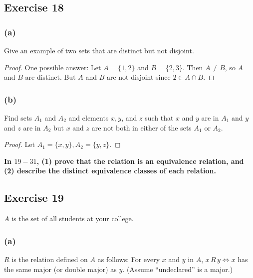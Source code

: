 \documentclass[14pt]{extarticle}
\newcommand{\cy}{\color{cyan}}
\begin{document}
\subsection{Exercise 18}

\subsubsection{(a)}
Give an example of two sets that are distinct but not disjoint.

\begin{proof}
One possible answer: Let \(A = \{1, 2\}\) and \(B = \{2, 3\}\). Then \(A \neq B\), so \(A\) and \(B\) are distinct. 
But \(A\) and \(B\) are not disjoint since \(2 \in A \cap B\).
\end{proof}

\subsubsection{(b)}
Find sets \(A_1\) and \(A_2\) and elements \(x, y\), and \(z\) such that \(x\) and \(y\) are in \(A_1\) and \(y\) and 
\(z\) are in \(A_2\) but \(x\) and \(z\) are not both in either of the sets \(A_1\) or \(A_2\).

\begin{proof}
Let \(A_1 = \{x, y\}, A_2 = \{y, z\}\).
\end{proof}

{\bf \cy In $19-31$, (1) prove that the relation is an equivalence relation, and (2) describe the distinct 
equivalence classes of each relation.}

\subsection{Exercise 19}
\(A\) is the set of all students at your college.

\subsubsection{(a)}
\(R\) is the relation defined on \(A\) as follows: For every \(x\) and \(y\) in \(A\), \(x \,R\, y \iff x\) has 
the same major (or double major) as \(y\). (Assume “undeclared” is a major.)
\end{document}
